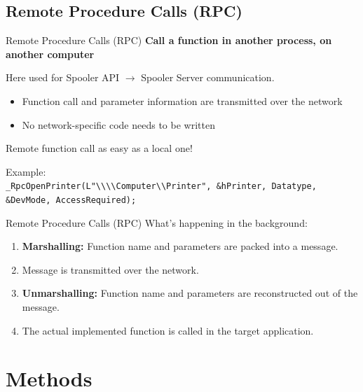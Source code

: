 \documentclass[aspectratio=1610]{beamer}
\newcommand\myheading[1]{{\Large\bfseries#1}\par\bigskip}
\begin{document}
\subsection{Remote Procedure Calls (RPC)}
\begin{frame}{Remote Procedure Calls (RPC)}
	\myheading{Call a function in another process, on another computer}
	
	Here used for Spooler API $\rightarrow$ Spooler Server communication.
	\bigskip
	
	\begin{itemize}
		\item Function call and parameter information are transmitted over the network
		\item No network-specific code needs to be written
	\end{itemize}
	
	\bigskip
	\pause
	
	Remote function call as easy as a local one!
	
	\bigskip
	
	Example:\\
	\footnotesize\texttt{\_RpcOpenPrinter(L"\textbackslash\textbackslash\textbackslash\textbackslash Computer\textbackslash\textbackslash Printer", \&hPrinter, Datatype, \&DevMode, AccessRequired);}
\end{frame}

\begin{frame}{Remote Procedure Calls (RPC)}
	What's happening in the background:

	\begin{enumerate}
		\item \textbf{Marshalling:} Function name and parameters are packed into a message.
		\item Message is transmitted over the network.
		\item \textbf{Unmarshalling:} Function name and parameters are reconstructed out of the message.
		\item The actual implemented function is called in the target application.
	\end{enumerate}
\end{frame}

\section{Methods}
\end{document}
